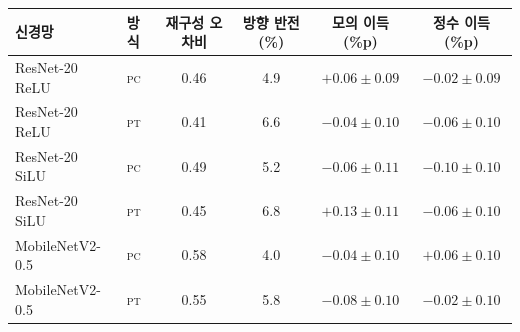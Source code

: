 \setlength{\tabcolsep}{5pt}
\begin{tabular}{llcccc}
\toprule
신경망 & 방식 & 재구성 오차비 & 방향 반전(\%) & 모의 이득(\%p) & 정수 이득(\%p) \\
\midrule
ResNet-20 ReLU & \textsc{pc} & 0.46 & 4.9 & $+0.06 \pm 0.09$ & $-0.02 \pm 0.09$ \\
ResNet-20 ReLU & \textsc{pt} & 0.41 & 6.6 & $-0.04 \pm 0.10$ & $-0.06 \pm 0.10$ \\
ResNet-20 SiLU & \textsc{pc} & 0.49 & 5.2 & $-0.06 \pm 0.11$ & $-0.10 \pm 0.10$ \\
ResNet-20 SiLU & \textsc{pt} & 0.45 & 6.8 & $+0.13 \pm 0.11$ & $-0.06 \pm 0.10$ \\
MobileNetV2-0.5 & \textsc{pc} & 0.58 & 4.0 & $-0.04 \pm 0.10$ & $+0.06 \pm 0.10$ \\
MobileNetV2-0.5 & \textsc{pt} & 0.55 & 5.8 & $-0.08 \pm 0.10$ & $-0.02 \pm 0.10$ \\
\bottomrule
\end{tabular}
